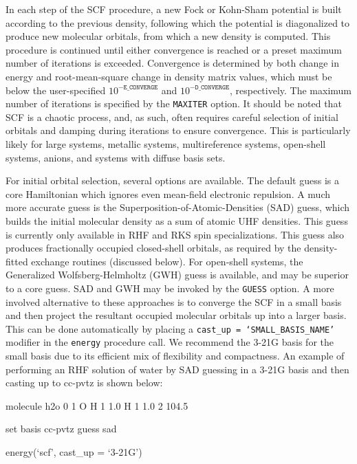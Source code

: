 In each step of the SCF procedure, a new Fock or Kohn-Sham potential is built
according to the previous density, following which the potential is diagonalized
to produce new molecular orbitals, from which a new density is computed. This
procedure is continued until either convergence is reached or a preset maximum
number of iterations is exceeded. Convergence is determined by both change in
energy and root-mean-square change in density matrix values, which must be below
the user-specified $10^{\mathtt{-E\_CONVERGE}}$ and
$10^{-\mathtt{D\_CONVERGE}}$, respectively. The maximum number of iterations is
specified by the \texttt{MAXITER} option. It should be noted that SCF is a
chaotic process, and, as such, often requires careful selection of initial
orbitals and damping during iterations to ensure convergence. This is
particularly likely for large systems, metallic systems, multireference systems,
open-shell systems, anions, and systems with diffuse basis sets. 

For initial orbital selection, several options are available. The default guess
is a core Hamiltonian which ignores even mean-field electronic repulsion. A much
more accurate guess is the Superposition-of-Atomic-Densities (SAD) guess, which
builds the initial molecular density as a sum of atomic UHF densities. This
guess is currently only available in RHF and RKS spin specializations. This
guess also produces fractionally occupied closed-shell orbitals, as required by
the density-fitted exchange routines (discussed below). For open-shell systems,
the Generalized Wolfsberg-Helmholtz (GWH) guess is available, and may be
superior to a core guess. SAD and GWH may be invoked by the \texttt{GUESS}
option. A more involved alternative to these approaches is to converge the SCF
in a small basis and then project the resultant occupied molecular orbitals up
into a larger basis. This can be done automatically by placing a
\texttt{cast\_up = `SMALL\_BASIS\_NAME'} modifier in the \texttt{energy}
procedure call. We recommend the 3-21G basis for the small basis due to its
efficient mix of flexibility and compactness. An example of performing an RHF
solution of water by SAD guessing in a 3-21G basis and then casting up to
cc-pvtz is shown below: 
\begin{Snippet}
molecule h2o {
0 1
O
H 1 1.0
H 1 1.0 2 104.5
}

set {
basis cc-pvtz 
guess sad
}

energy(`scf', cast_up = `3-21G')
\end{Snippet}

